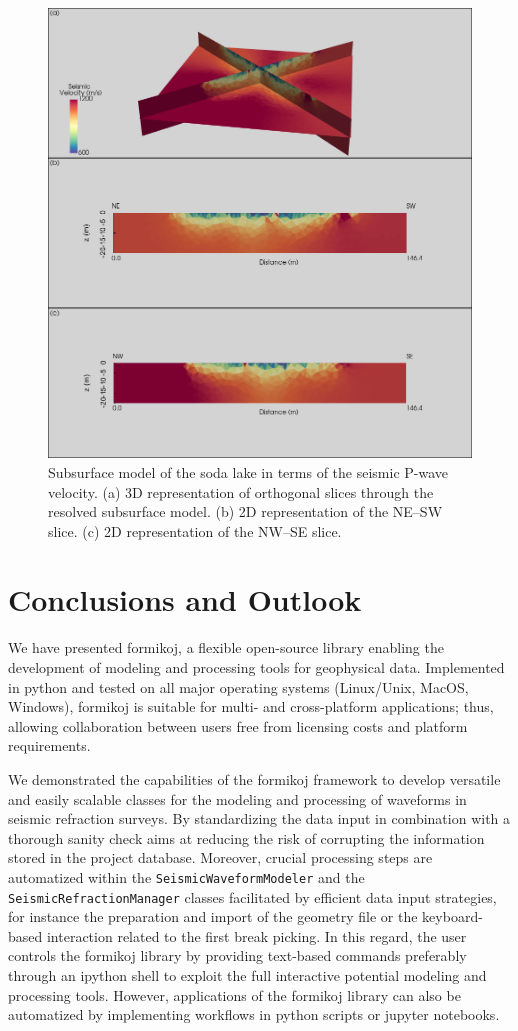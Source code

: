 \documentclass[a4paper,fleqn]{cas-sc}
\begin{document}
\begin{figure}
	\centering
	\includegraphics[width=.75\textwidth]{figures/inv_l100_ae0.0035.png}
	\caption{Subsurface model of the soda lake in terms of the seismic P-wave velocity. (a) 3D representation of orthogonal slices through the resolved subsurface model. (b) 2D representation of the NE--SW slice. (c) 2D representation of the NW--SE slice.}
	\label{fig:3dinvres}
\end{figure}

\section{Conclusions and Outlook}

We have presented formikoj, a flexible open-source library enabling the development of modeling and processing tools for geophysical data. Implemented in python and tested on all major operating systems (Linux/Unix, MacOS, Windows), formikoj is suitable for multi- and cross-platform applications; thus, allowing collaboration between users free from licensing costs and platform requirements.

We demonstrated the capabilities of the formikoj framework to develop versatile and easily scalable classes for the modeling and processing of waveforms in seismic refraction surveys. By standardizing the data input in combination with a thorough sanity check aims at reducing the risk of corrupting the information stored in the project database.
Moreover, crucial processing steps are automatized within the \texttt{SeismicWaveformModeler} and the\\ \texttt{SeismicRefractionManager} classes facilitated by efficient data input strategies, for instance the preparation and import of the geometry file or the keyboard-based interaction related to the first break picking. In this regard, the user controls the formikoj library by providing text-based commands preferably through an ipython shell to exploit the full interactive potential modeling and processing tools. However, applications of the formikoj library can also be automatized by implementing workflows in python scripts or jupyter notebooks.
\end{document}
